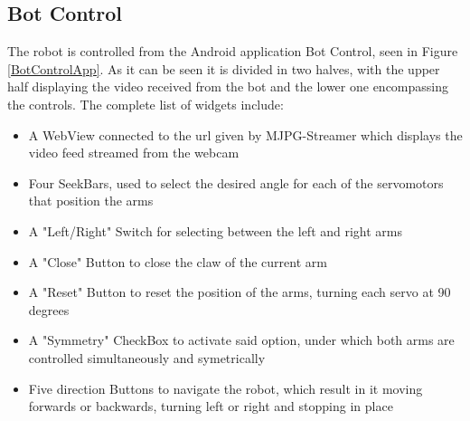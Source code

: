 \subsection{Bot Control}

The robot is controlled from the Android application Bot Control, seen in Figure \ref{BotControlApp}. As it can be seen it is divided in two halves, with the upper half displaying the video received from the bot and the lower one encompassing the controls. The complete list of widgets include:

	\begin{itemize}
	\item A WebView connected to the url given by MJPG-Streamer which displays the video feed streamed from the webcam

	\item Four SeekBars, used to select the desired angle for each of the servomotors that position the arms

	\item A "Left/Right" Switch for selecting between the left and right arms

	\item A "Close" Button to close the claw of the current arm

	\item A "Reset" Button to reset the position of the arms, turning each servo at 90 degrees

	\item A "Symmetry" CheckBox to activate said option, under which both arms are controlled simultaneously and symetrically

	\item Five direction Buttons to navigate the robot, which result in it moving forwards or backwards, turning left or right and stopping in place

	\end{itemize}
 

